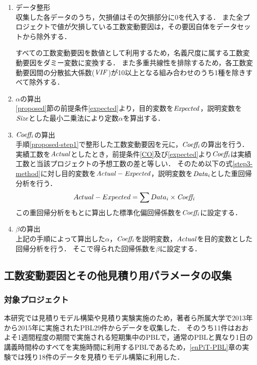 \documentclass{compsoft}
\begin{document}
\begin{enumerate}
\item データ整形 \label{proposed-step1} \\
収集した各データのうち，欠損値はその欠損部分に0を代入する．
また全プロジェクトで値が欠損している工数変動要因は，その要因自体をデータセットから除外する．

すべての工数変動要因を数値として利用するため，名義尺度に属する工数変動要因をダミー変数に変換する．
また多重共線性を排除するため，各工数変動要因間の分散拡大係数(${\it VIF} $)が10以上となる組み合わせのうち1種を除きすべて除外する．

\item $ \alpha $の算出 \label{proposed-step2} \\
\ref{proposed}節の前提条件\ref{expected}より，目的変数を$ {\it Expected} $，説明変数を${\it Size}$とした最小二乗法により定数$\alpha$を算出する．

\item $ {\it Coeff_{i} } $の算出 \label{proposed-step3} \\
手順\ref{proposed-step1}で整形した工数変動要因を元に，$ {\it Coeff_{i} } $の算出を行う．
実績工数を$ {\it Actual} $としたとき，前提条件\ref{CO}及び\ref{expected}より$ {\it Coeff_{i} } $は実績工数と当該プロジェクトの予想工数の差と等しい．
そのため以下の式\ref{step3-method}に対し目的変数を$ {\it Actual - Expected } $，説明変数を$ {\it Data_{i}} $とした重回帰分析を行う．
\begin{equation}
Actual - Expected = \sum Data_i \times {\it Coeff_i} \label{step3-method}
\end{equation}
この重回帰分析をもとに算出した標準化偏回帰係数を$ {\it Coeff_{i} } $に設定する．

\item $ \beta $の算出 \label{proposed-step4} \\
上記の手順によって算出した$ \alpha $，$ {\it Coeff_{i}} $を説明変数，${\it Actual }$を目的変数とした回帰分析を行う．
そこで得られた回帰係数を$ \beta $に設定する．
  
\end{enumerate}

\subsection{工数変動要因とその他見積り用パラメータの収集} \label{used-data}
\subsubsection{対象プロジェクト} \label{obj-project}
本研究では見積りモデル構築や見積り実験実施のため，著者ら所属大学で2013年から2015年に実施されたPBL29件からデータを収集した．
そのうち11件はおおよそ1週間程度の期間で実施される短期集中のPBLで，通常のPBLと異なり1日の講義時間枠のすべてを実施時間に利用するPBLであるため，\ref{enPiT-PBL}章の実験では残り18件のデータを見積りモデル構築に利用した．
\end{document}
